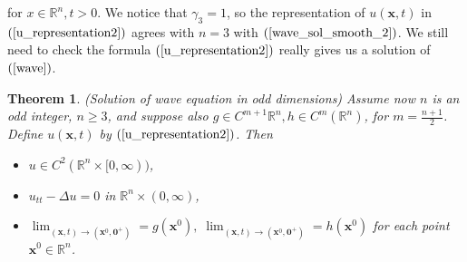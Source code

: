 \documentclass[10pt]{article}
\def\rr{{\mathbb R}}
\def\vc{{\mathbf x}}
\def\lu{{\Delta  u}}
\newtheorem{theorem}{Theorem}[section]
\begin{document}
for $x\in \rr^n, t>0$. We notice that $\gamma_3=1$, so the representation of $u(\vc,t)$ in $(\ref{u_representation2})$ agrees with $n=3$ with $(\ref{wave_sol_smooth_2})$. We still need to check the formula $(\ref{u_representation2})$ really gives us a solution of $(\ref{wave})$.
\begin{theorem}(Solution of wave equation in odd dimensions)
    Assume now 
    $n$ is an odd integer, $n\geq 3$,
    and suppose also $g\in C^{m+1}{\rr^n} ,h\in C^{m}(\rr^n)$, for $m=\frac{n+1}{2}$. Define $u(\vc,t)$ by $(\ref{u_representation2})$. Then
    \begin{itemize}
        \item [(i)] $u\in C^2(\rr^n\times [0,\infty))$,
        \item [(ii)] $u_{tt} -\lu = 0$ in $\rr^n\times (0,\infty)$,
        \item [(iii)] $\lim_{(\vc,t) \to (\vc^0,\mathbf{0}^+)} = g(\vc^0),\; \lim_{(\vc,t)\to(\vc^0,\mathbf{0^+})} = h(\mathbf{x}^0)$ for each point $\vc^0\in \rr^n$.
    \end{itemize}
\end{theorem}
\end{document}
